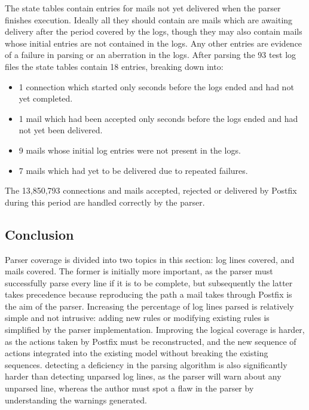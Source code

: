 \documentclass[a4paper,12pt,draft]{article}
\begin{document}
The state tables contain entries for mails not yet delivered when the
parser finishes execution.  Ideally all they should contain are mails which
are awaiting delivery after the period covered by the logs, though they may
also contain mails whose initial entries are not contained in the logs.
Any other entries are evidence of a failure in parsing or an aberration in
the logs.  After parsing the 93 test log files the state tables contain 18
entries, breaking down into:

\begin{itemize}

    \item 1 connection which started only seconds before the logs ended and
        had not yet completed.

    \item 1 mail which had been accepted only seconds before the logs ended
        and had not yet been delivered.

    \item 9 mails whose initial log entries were not present in the logs.

    \item 7 mails which had yet to be delivered due to repeated failures.

\end{itemize}

The 13,850,793 connections and mails accepted, rejected or delivered by
Postfix during this period are handled correctly by the parser.

\subsection{Conclusion}

Parser coverage is divided into two topics in this section: log lines
covered, and mails covered.  The former is initially more important, as the
parser must successfully parse every line if it is to be complete, but
subsequently the latter takes precedence because reproducing the path a
mail takes through Postfix is the aim of the parser.  Increasing the
percentage of log lines parsed is relatively simple and not intrusive:
adding new rules or modifying existing rules is simplified by the parser
implementation.  Improving the logical coverage is harder, as the actions
taken by Postfix must be reconstructed, and the new sequence of actions
integrated into the existing model without breaking the existing sequences.
detecting a deficiency in the parsing algorithm is also significantly
harder than detecting unparsed log lines, as the parser will warn about any
unparsed line, whereas the author must spot a flaw in the parser by
understanding the warnings generated.
\end{document}
